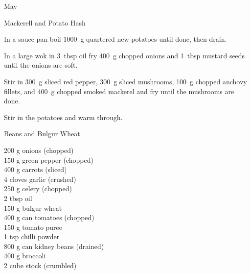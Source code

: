 \begin{menu}{May}
\begin{recipe}{2}{Mackerell and Potato Hash}
\begin{ingredients}
		\end{ingredients}
	
	
    \begin{instructions}
    \item 
        In a sauce pan boil
        1000~g quartered new potatoes
        until done,
        then drain.
      \item 
        In a large wok in
        3~tbsp  oil
        fry
        400~g chopped onions
        and
        1~tbsp  mustard seeds
        until the onions are soft.
      \item 
        Stir in
        300~g sliced red pepper,
        300~g sliced mushrooms,
        100~g chopped anchovy fillets,
        and
        400~g chopped smoked mackerel
        and fry until the mushrooms are done.
      \item 
        Stir in the potatoes
        and warm through.
      
    \end{instructions}
    \end{recipe}%
  
    \begin{recipe}{2}{Beans and Bulgur Wheat}%
		\begin{ingredients}
		200 g onions (chopped) \\
	150 g green pepper (chopped) \\
	400 g carrots (sliced) \\
	4 cloves garlic (crushed) \\
	250 g celery (chopped) \\
	2 tbsp oil  \\
	150 g bulgur wheat  \\
	400 g can tomatoes (chopped) \\
	150 g tomato puree  \\
	1 tsp chilli powder  \\
	800 g can kidney beans (drained) \\
	400 g broccoli  \\
	2 cube stock (crumbled) \\
	
		\end{ingredients}
	
	

\end{recipe}
\end{menu}
